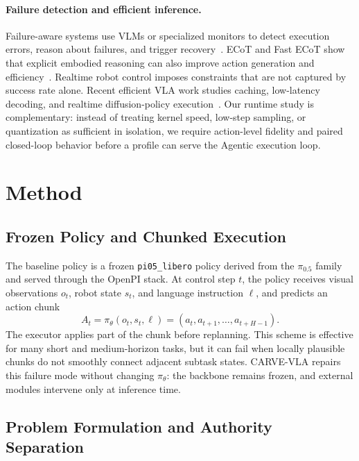 \documentclass[runningheads]{waica}
\newcommand{\method}{CARVE-VLA}
\newcommand{\pizero}{$\pi_{0.5}$}
\begin{document}
\paragraph{Failure detection and efficient inference.}
Failure-aware systems use VLMs or specialized monitors to detect execution errors, reason about failures, and trigger recovery~\cite{duan2024aha,grislain2025ifailsense,lin2025failsafe}.
ECoT and Fast ECoT show that explicit embodied reasoning can also improve action generation and efficiency~\cite{zawalski2024ecot,duan2025fastecot}.
Realtime robot control imposes constraints that are not captured by success rate alone.
Recent efficient VLA work studies caching, low-latency decoding, and realtime diffusion-policy execution~\cite{xu2025vlacache,guan2025efficientvlasurvey,niu2026realtimevlaflash,yang2026realtimevlav2}.
Our runtime study is complementary: instead of treating kernel speed, low-step
sampling, or quantization as sufficient in isolation, we require action-level
fidelity and paired closed-loop behavior before a profile can serve the
Agentic execution loop.

\section{Method}
\label{sec:method}

\subsection{Frozen Policy and Chunked Execution}

The baseline policy is a frozen \texttt{pi05\_libero} policy derived from the \pizero{} family and served through the OpenPI stack.
At control step $t$, the policy receives visual observations $o_t$, robot state $s_t$, and language instruction $\ell$, and predicts an action chunk
\begin{equation}
A_t = \pi_\theta(o_t,s_t,\ell) =
(a_t,a_{t+1},\ldots,a_{t+H-1}).
\end{equation}
The executor applies part of the chunk before replanning.
This scheme is effective for many short and medium-horizon tasks, but it can fail when locally plausible chunks do not smoothly connect adjacent subtask states.
\method{} repairs this failure mode without changing $\pi_\theta$: the backbone remains frozen, and external modules intervene only at inference time.

\subsection{Problem Formulation and Authority Separation}
\end{document}
